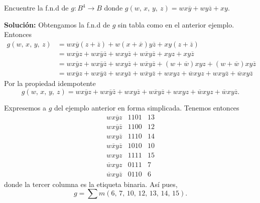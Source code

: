 \begin{myexample}
    Encuentre la f.n.d de $g:B^4 \longrightarrow B$ donde $g(w, \, x, \, y, \ z) = wx\overline{y} + wy\overline{z} + xy$.

    \tcblower
    \textbf{\color{jblueleft}Solución:} Obtengamos la f.n.d de $g$ sin tabla como en el anterior ejemplo. Entonces
    \begin{align*}
        g(w, \, x, \, y, \ z) & = wx\overline{y} (z+\overline{z}) + w(x+\overline{x})y\overline{z} + xy(z+\overline{z}) \\
        & = wx\overline{y} z + wx\overline{y}\overline{z} + wxy\overline{z} + w\overline{x}y\overline{z} + xyz + xy\overline{z} \\
        & = wx\overline{y} z + wx\overline{y}\overline{z} + wxy\overline{z} + w\overline{x}y\overline{z} + (w+\overline{w})xyz + (w+\overline{w})xy\overline{z} \\
        & = wx\overline{y} z + wx\overline{y}\overline{z} + wxy\overline{z} + w\overline{x}y\overline{z} + wxyz + \overline{w}xyz + wxy\overline{z} + \overline{w}xy\overline{z}
    \end{align*}
    Por la propiedad idempotente
    $$g(w, \, x, \, y, \ z) = wx\overline{y}z + wx\overline{y}\bar{z} + wxy\overline{z} + w\overline{x}y\overline{z} + wxyz + \overline{w}xyz + \overline{w}xy\overline{z}.$$
\end{myexample}

\newpage

\begin{BOX}
    Expresemos a $g$ del ejemplo anterior en forma simplicada. Tenemos entonces
    $$\begin{array}{llr}
        wx\overline{y}z & 1101 & 13 \\
        wx\overline{y}\bar{z} & 1100 & 12 \\
        wxy\overline{z} & 1110 & 14 \\
        w\overline{x}y\overline{z} & 1010 & 10 \\
        wxyz & 1111 & 15 \\
        \overline{w}xyz & 0111 & 7 \\
        \overline{w}xy\overline{z} & 0110 & 6
    \end{array}$$
    donde la tercer columna es la etiqueta binaria. Así pues,
    $$g = \sum m(6, \, 7, \, 10, \, 12, \, 13, \, 14, \, 15).$$
\end{BOX}

